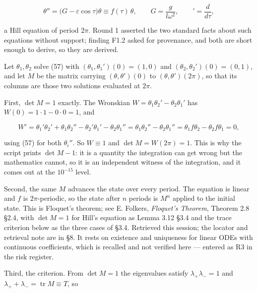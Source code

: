 \documentclass[11pt,a4paper]{article}
\newcommand{\tagmark}[1]{\marginnote{\scriptsize\ttfamily #1}}
\newcommand{\Dtag}{\tagmark{[D]}}   %
\newcommand{\Vtag}[1]{\tagmark{[V] #1}}  %
\begin{document}
\begin{equation}
\theta'' = \bigl(G-\varepsilon\cos\tau\bigr)\theta \equiv f(\tau)\,\theta,
  \qquad G=\frac{g}{l\omega^2},\qquad {}'=\frac{d}{d\tau}, \tag{57}
\end{equation}

a Hill equation of period \(2\pi\). Round 1 asserted the two standard facts about
such equations without support; finding F1.2 asked for provenance, and both are
short enough to derive, so they are derived.

Let \(\theta_1,\theta_2\) solve (57) with \((\theta_1,\theta_1')(0)=(1,0)\) and
\((\theta_2,\theta_2')(0)=(0,1)\), and let \(M\) be the matrix carrying
\((\theta,\theta')(0)\) to \((\theta,\theta')(2\pi)\), so that its columns are those
two solutions evaluated at \(2\pi\).

\Dtag{} First, \(\det M=1\) exactly. The Wronskian
\(W=\theta_1\theta_2'-\theta_2\theta_1'\) has \(W(0)=1\cdot1-0\cdot0=1\), and

\begin{equation}
W' = \theta_1'\theta_2' + \theta_1\theta_2''
     - \theta_2'\theta_1' - \theta_2\theta_1''
     = \theta_1\theta_2'' - \theta_2\theta_1''
     = \theta_1 f\theta_2 - \theta_2 f\theta_1 = 0, \tag{58}
\end{equation}

using (57) for both \(\theta_i''\). So \(W\equiv1\) and \(\det M=W(2\pi)=1\). This is
why the script prints \(\det M-1\): it is a quantity the integration can get
wrong but the mathematics cannot, so it is an independent witness of the
integration, and it comes out at the \(10^{-15}\) level.

\Vtag{Folkers 2018, Thm 2.8 \S2.4} Second, the same \(M\) advances the state over every period. The
equation is linear and \(f\) is \(2\pi\)-periodic, so the state after \(n\) periods is
\(M^n\) applied to the initial state. This is Floquet's theorem; see E. Folkers,
\textit{Floquet's Theorem}, Theorem 2.8 §2.4, with \(\det M=1\) for Hill's equation as
Lemma 3.12 §3.4 and the trace criterion below as the three cases of §3.4.
Retrieved this session; the locator and retrieval note are in §8. It rests on
existence and uniqueness for linear ODEs with continuous coefficients, which is
recalled and not verified here --- entered as R3 in the risk register.

\Dtag{} Third, the criterion. From \(\det M=1\) the eigenvalues satisfy
\(\lambda_+\lambda_-=1\) and \(\lambda_++\lambda_-=\operatorname{tr}M\equiv T\), so
\end{document}
